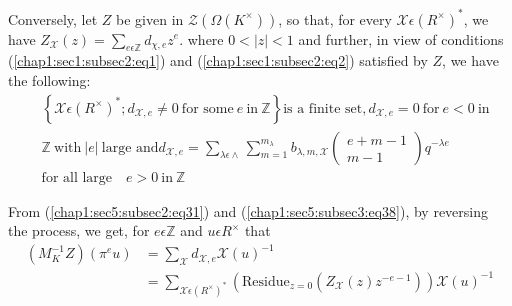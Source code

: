  Conversely, let $Z$ be given in $\mathscr{Z}(\Omega(K^\times ))$, so
 that, for every $\mathcal{X}\epsilon(R^\times)^{\ast}$, we have
 $Z_{\mathcal{X}}(z)=\sum\limits_{e \epsilon
   \mathbb{Z}}d_{\chi,e} z^{e}$. where $0<|z|<1$ and further,
 in view of  conditions (\ref{chap1:sec1:subsec2:eq1}) and
 (\ref{chap1:sec1:subsec2:eq2})  satisfied by $Z$, we have the
 following:
\begin{align*}
& \left\{\mathcal{X}\epsilon(R^\times)^*;d_{\mathcal{X},e}\neq 0~\text{for some}~
 e ~\text{in}~ \mathbb{Z}\right\} \text{is a finite set} ,
 d_{\mathcal{X},e}= 0 ~\text{for}~ e<0 
 ~\text{in}\\ 
 & \mathbb{Z} ~\text{with}~ |e| ~\text{large and}
  d_{\mathcal{X},e}=\sum\limits_{\lambda \epsilon
   \wedge}\sum\limits_{m=1}^{m_{\lambda}}b_{\lambda,m,\mathcal{X}}
  \begin{pmatrix}
    e+m-1\\
    m-1
  \end{pmatrix}
 q^{-\lambda e}\\
& \text{for all large}\quad e>0~\text{in}~
 \mathbb{Z}\tag{39}\label{chap1:sec5:subsec3:eq39} 
\end{align*}

From (\ref{chap1:sec5:subsec2:eq31}) and
(\ref{chap1:sec5:subsec3:eq38}), by reversing the process, we get, for 
$e\epsilon \mathbb{Z}$ and $u\epsilon R^\times $ that
\begin{align*}
  (M_{K}^{-1}Z)(\pi^{e}u)&
  =\sum\limits_{\mathcal{X}}d_{\mathcal{X},e}\mathcal{X}(u)^{-1}\\  
  &  =\sum\limits_{\mathcal{X}\epsilon(R^\times )^{\ast}}
  (\text{Residue}_{z=0}(Z_{\mathcal{X}}(z)z^{-e-1}))\mathcal{X}(u)^{-1}
  \tag{40}\label{chap1:sec5:subsec3:eq40} 
\end{align*}

